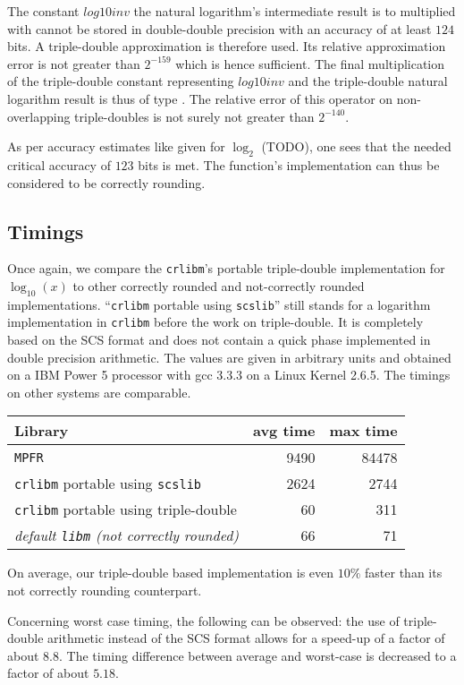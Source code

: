 The constant $\mathit{log10inv}$ the natural logarithm's intermediate
result is to multiplied with cannot be stored in double-double
precision with an accuracy of at least $124$ bits. A triple-double
approximation is therefore used. Its relative approximation error is
not greater than $2^{-159}$ which is hence sufficient. The final
multiplication of the triple-double constant representing
$\mathit{log10inv}$ and the triple-double natural logarithm result is
thus of type \MulTT. The relative error of this operator on
non-overlapping triple-doubles is not surely not greater than
$2^{-140}$.

As per accuracy estimates like given for $\log_2$ (TODO), one sees that the needed critical accuracy
of $123$ bits is met. The function's implementation can thus be
considered to be correctly rounding.

\subsection{Timings}\label{subsec:timingslog10}
%
Once again, we compare the {\tt crlibm}'s portable triple-double
implementation for $\log_{10}\left( x \right)$ to other correctly
rounded and not-correctly rounded implementations.  ``{\tt crlibm}
portable using {\tt scslib}'' still stands for a logarithm
implementation in {\tt crlibm} before the work on triple-double. It is
completely based on the SCS format and does not contain a quick phase
implemented in double precision arithmetic. The values are given in
arbitrary units and obtained on a IBM Power 5 processor with gcc 3.3.3
on a Linux Kernel 2.6.5. The timings on other systems are comparable.
\begin{center}
\begin{tabular}{|l|r|r|}
 \hline
  Library                       &     avg time  & max time \\
 \hline
 \hline
 \texttt{MPFR}   &   9490    & 84478        \\ 
 \hline
 \texttt{crlibm} portable using \texttt{scslib}   &   2624    & 2744        \\ 
 \hline
 \texttt{crlibm} portable using triple-double      &        60    & 311        \\ 
 \hline
 \emph{default \texttt{libm} (not correctly rounded) }  &        66    & 71      \\ 
 \hline
\end{tabular}
\end{center}
On average, our triple-double based implementation is even $10\%$ 
faster than its not correctly rounding counterpart.

Concerning worst case timing, the following can be observed: the use of
triple-double arithmetic instead of the SCS format allows for a
speed-up of a factor of about $8.8$. The timing difference between
average and worst-case is decreased to a factor of about $5.18$.





